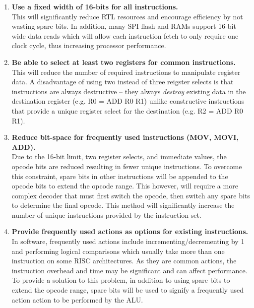 \begin{enumerate}[leftmargin=3\parindent, label=\bfseries ISA\arabic*, style=nextline]
\item{\textbf{Use a fixed width of 16-bits for all instructions.}\\
This will significantly reduce RTL resources and encourage efficiency by not wasting spare bits. In addition, many SPI flash and RAMs support 16-bit wide data reads which will allow each instruction fetch to only require one clock cycle, thus increasing processor performance.}\label{isa:16}

\item{\textbf{Be able to select at least two registers for common instructions.}\\
This will reduce the number of required instructions to manipulate register data. A disadvantage of using two instead of three reigster selects is that instructions are always destructive -- they always \textit{destroy} existing data in the destination register (e.g. R0 = ADD R0 R1) unlike constructive instructions that provide a unique register select for the destination (e.g. R2 = ADD R0 R1). }\label{isa:regs}

\item{\textbf{Reduce bit-space for frequently used instructions (MOV, MOVI, ADD).}\\
Due to the 16-bit limit, two register selects, and immediate values, the opcode bits are reduced resulting in fewer unique instructions. To overcome this constraint, spare bits in other instructions will be appended to the opcode bits to extend the opcode range. This however, will require a more complex decoder that must first switch the opcode, then switch any spare bits to determine the final opcode. This method will significantly increase the number of unique instructions provided by the instruction set.}\label{isa:bits}

\item{\textbf{Provide frequently used actions as options for existing instructions.}\\
In software, frequently used actions include incrementing/decrementing by 1 and performing logical comparisons which usually take more than one instruction on some RISC architectures. As they are common actions, the instruction overhead and time may be significant and can affect performance. To provide a solution to this problem, in addition to using spare bits to extend the opcode range, spare bits will be used to signify a frequently used action action to be performed by the ALU.

}
\end{enumerate}
